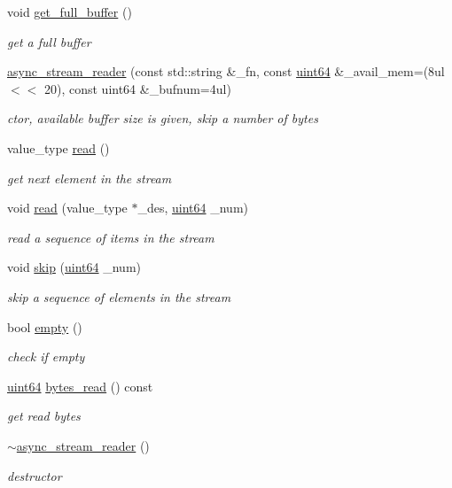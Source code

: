 \begin{DoxyCompactItemize}
\item 
void \hyperlink{classasync__stream__reader_a15c2bd3c259b3a84de866c02dd6c7405}{get\+\_\+full\+\_\+buffer} ()
\begin{DoxyCompactList}\small\item\em get a full buffer \end{DoxyCompactList}\item 
\hyperlink{classasync__stream__reader_a02dc7a7adb24a552a265b30ba8544223}{async\+\_\+stream\+\_\+reader} (const std\+::string \&\+\_\+fn, const \hyperlink{types_8h_a60e8696a4678cd348e991a1f172e53f7}{uint64} \&\+\_\+avail\+\_\+mem=(8ul$<$$<$ 20), const uint64 \&\+\_\+bufnum=4ul)
\begin{DoxyCompactList}\small\item\em ctor, available buffer size is given, skip a number of bytes \end{DoxyCompactList}\item 
value\+\_\+type \hyperlink{classasync__stream__reader_abb382de67d33724ff4fea6714fc67ac8}{read} ()
\begin{DoxyCompactList}\small\item\em get next element in the stream \end{DoxyCompactList}\item 
void \hyperlink{classasync__stream__reader_ac441a02e7bb4708948552ce7ced4e9d4}{read} (value\+\_\+type $\ast$\+\_\+des, \hyperlink{types_8h_a60e8696a4678cd348e991a1f172e53f7}{uint64} \+\_\+num)
\begin{DoxyCompactList}\small\item\em read a sequence of items in the stream \end{DoxyCompactList}\item 
void \hyperlink{classasync__stream__reader_a66bc0e20739b27b9c703be9254cdbe05}{skip} (\hyperlink{types_8h_a60e8696a4678cd348e991a1f172e53f7}{uint64} \+\_\+num)
\begin{DoxyCompactList}\small\item\em skip a sequence of elements in the stream \end{DoxyCompactList}\item 
bool \hyperlink{classasync__stream__reader_accade2559119f3bed538d20f6eec4cfb}{empty} ()
\begin{DoxyCompactList}\small\item\em check if empty \end{DoxyCompactList}\item 
\hyperlink{types_8h_a60e8696a4678cd348e991a1f172e53f7}{uint64} \hyperlink{classasync__stream__reader_a15f6c24ea5065855b1d5df69cc7e3e1a}{bytes\+\_\+read} () const
\begin{DoxyCompactList}\small\item\em get read bytes \end{DoxyCompactList}\item 
\hyperlink{classasync__stream__reader_acfbb53847f349372dd3bb0455d9dfaa9}{$\sim$async\+\_\+stream\+\_\+reader} ()
\begin{DoxyCompactList}\small\item\em destructor \end{DoxyCompactList}\end{DoxyCompactItemize}

